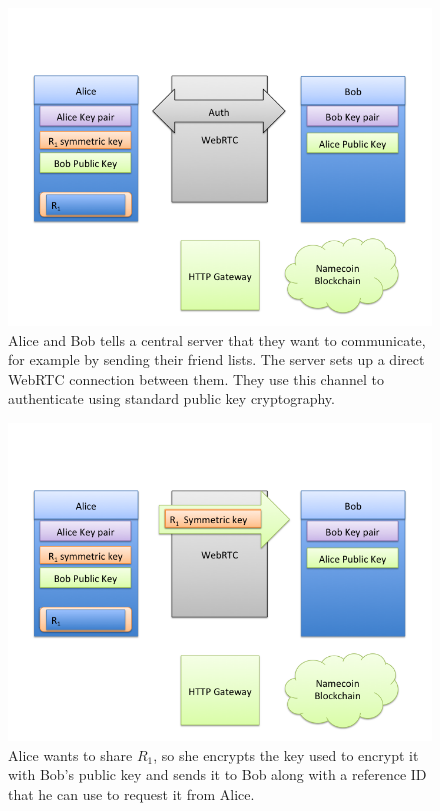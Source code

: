 \begin{figure}[h]
\centering
\includegraphics[width=\textwidth,height=0.2\paperheight,keepaspectratio
]{slides/Slide3.png}
\caption{Alice and Bob tells a central server that they want to communicate, for example by sending their friend lists. The server sets up a direct WebRTC connection between them. They use this channel to authenticate using standard public key cryptography.}
\label{fig:slide3}
\end{figure}
\begin{figure}[h]
\centering
\includegraphics[width=\textwidth,height=0.2\paperheight,keepaspectratio
]{slides/Slide4.png}
\caption{Alice wants to share $R_1$, so she encrypts the key used to encrypt it with Bob's public key and sends it to Bob along with a reference ID that he can use to request it from Alice.}
\label{fig:slide4}
\end{figure}
